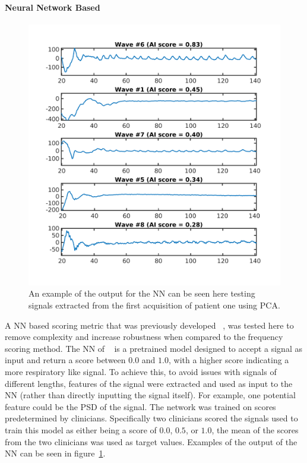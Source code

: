             \paragraph{Neural Network Based} \label{sec:neural_network_based}
                \begin{figure}
                    \centering
                    
                    \includegraphics[width=1.0\linewidth]{neural_network_output.png}
                    
                    \captionsetup{singlelinecheck=false}
                    \caption{An example of the output for the \gls{NN} can be seen here testing signals extracted from the first acquisition of patient one using \gls{PCA}.}
                    \label{fig:neural_network_output}
                \end{figure}
                
                A \gls{NN} based scoring metric that was previously developed ~\parencite{Walker2020AutomaticAI}, was tested here to remove complexity and increase robustness when compared to the frequency scoring method. The \gls{NN} of ~\parencite{Walker2020AutomaticAI} is a pretrained model designed to accept a signal as input and return a score between $0.0$ and $1.0$, with a higher score indicating a more respiratory like signal. To achieve this, to avoid issues with signals of different lengths, features of the signal were extracted and used as input to the \gls{NN} (rather than directly inputting the signal itself). For example, one potential feature could be the \gls{PSD} of the signal. The network was trained on scores predetermined by clinicians. Specifically two clinicians scored the signals used to train this model as either being a score of $0.0$, $0.5$, or $1.0$, the mean of the scores from the two clinicians was used as target values. Examples of the output of the \gls{NN} can be seen in figure~\ref{fig:neural_network_output}.
            
